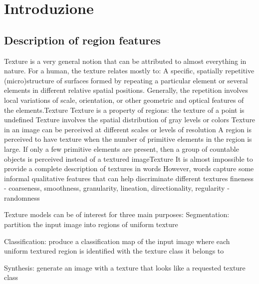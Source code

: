 \section{Introduzione}

\subsection{Description of region features}



Texture is a very general notion that can be
attributed to almost everything in nature.
For a human, the texture relates mostly to:
A specific, spatially repetitive (micro)structure of surfaces
formed by repeating a particular element or several
elements in different relative spatial positions.
Generally, the repetition involves local variations of scale,
orientation, or other geometric and optical features of the
elements.Texture
Texture is a property of regions: the texture of a
point is undefined
Texture involves the spatial distribution of gray
levels or colors
Texture in an image can be perceived at different
scales or levels of resolution
A region is perceived to have texture when the
number of primitive elements in the region is large. If
only a few primitive elements are present, then a
group of countable objects is perceived instead of a
textured imageTexture
It is almost impossible to provide a complete description of
textures in words
However, words capture some informal qualitative
features that can help
discriminate different
textures
fineness - coarseness,
smoothness,
granularity,
lineation,
directionality,
regularity - randomness


Texture models can be of interest for three
main purposes:
Segmentation: partition the input image
into regions of uniform texture


Classification: produce a classification map of the
input image where each uniform textured region
is identified with the texture class it belongs to


Synthesis: generate an image with a texture that
looks like a requested texture class